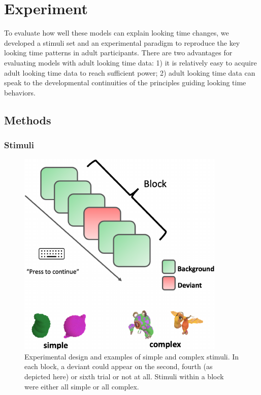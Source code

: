 \documentclass[10pt, letterpaper]{article}
\newenvironment{CodeChunk}{}{}
\begin{document}
\hypertarget{experiment}{%
\section{Experiment}\label{experiment}}

To evaluate how well these models can explain looking time changes, we
developed a stimuli set and an experimental paradigm to reproduce the
key looking time patterns in adult participants. There are two
advantages for evaluating models with adult looking time data: 1) it is
relatively easy to acquire adult looking time data to reach sufficient
power; 2) adult looking time data can speak to the developmental
continuities of the principles guiding looking time behaviors.

\hypertarget{methods}{%
\subsection{Methods}\label{methods}}

\hypertarget{stimuli}{%
\subsubsection{Stimuli}\label{stimuli}}

\begin{CodeChunk}
\begin{figure}[h]

{\centering \includegraphics{figs/experimental_design-1} 

}

\caption[Experimental design and examples of simple and complex stimuli]{Experimental design and examples of simple and complex stimuli. In each block, a deviant could appear on the second, fourth (as depicted here) or sixth trial or not at all. Stimuli within a block were either all simple or all complex.}\label{fig:experimental_design}
\end{figure}
\end{CodeChunk}
\end{document}
